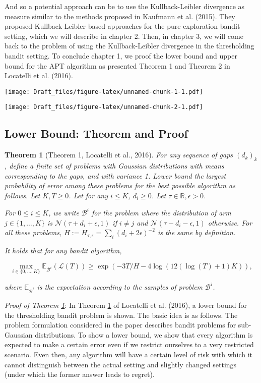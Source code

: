 \documentclass[12pt,]{article}
\newtheorem{theorem}{Theorem}
\begin{document}
And so a potential approach can be to use the Kullback-Leibler
divergence as measure similar to the methods proposed in Kaufmann et al.
(2015). They proposed Kullback-Leibler based approaches for the pure
exploration bandit setting, which we will describe in chapter 2. Then,
in chapter 3, we will come back to the problem of using the
Kullback-Leibler divergence in the thresholding bandit setting. To
conclude chapter 1, we proof the lower bound and upper bound for the APT
algorithm as presented Theorem 1 and Theorem 2 in Locatelli et al.
(2016).

\texttt{[image: Draft\_files/figure-latex/unnamed-chunk-1-1.pdf]}

\texttt{[image: Draft\_files/figure-latex/unnamed-chunk-2-1.pdf]}

\subsection{Lower Bound: Theorem and
Proof}\label{lower-bound-theorem-and-proof}

\begin{theorem}[Theorem 1, Locatelli et al., 2016] 
\label{theorem:Locatelli2016Theorem1}
For any sequence of gaps $(d_k)_k$, define a finite set of problems with Gaussian distributions with means corresponding to the gaps, and with variance 1. Lower bound the largest probability of error among these problems for the best possible algorithm as follows. Let $K,T \geq 0$. Let for any $i \leq K$, $d_i \geq 0$. Let $\tau \in \mathbb{R}, \epsilon > 0$.

For $0 \leq i \leq K$, we write $\mathcal{B}^i$ for the problem where the distribution of arm $j \in \{1, \dots, K\}$ is $\mathcal{N}(\tau+d_i+\epsilon, 1)$ if $i \neq j$ and $\mathcal{N}(\tau-d_i-\epsilon, 1)$ otherwise. For all these problems, $H := H_{\tau, \epsilon} = \sum_i (d_i+2\epsilon)^{-2}$ is the same by definition.

It holds that for any bandit algorithm,

\begin{equation*}
\max_{i \in \{0, \dots, K\}} \mathbb{E}_{\mathcal{B}^i} (\mathcal{L}(T)) \geq \exp(-3T/H-4 \log(12(\log(T)+1)K)),
\end{equation*}

where $\mathbb{E}_{\mathcal{B}^i}$ is the expectation according to the samples of problem $\mathcal{B}^i$.
\end{theorem}

\emph{Proof of Theorem \ref{theorem:Locatelli2016Theorem1}}: In Theorem
\ref{theorem:Locatelli2016Theorem1} of Locatelli et al. (2016), a lower
bound for the thresholding bandit problem is shown. The basic idea is as
follows. The problem formulation considered in the paper describes
bandit problems for sub-Gaussian distributions. To show a lower bound,
we show that every algorithm is expected to make a certain error even if
we restrict ourselves to a very restricted scenario. Even then, any
algorithm will have a certain level of risk with which it cannot
distinguish between the actual setting and slightly changed settings
(under which the former answer leads to regret).
\end{document}
